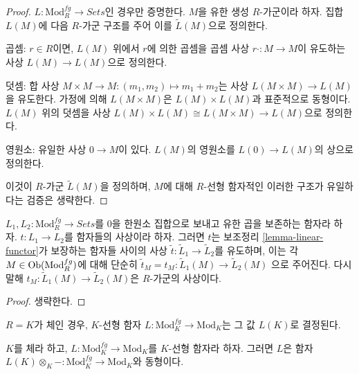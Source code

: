 \begin{proof}
$L: \text{Mod}^{fg}_R \to \textit{Sets}$인 경우만 증명한다.
$M$을 유한 생성 $R$-가군이라 하자. 집합 $L(M)$에 다음
$R$-가군 구조를 주어 이를 $\widetilde{L}(M)$으로 정의한다.

\medskip\noindent
곱셈: $r \in R$이면, $L(M)$ 위에서 $r$에 의한 곱셈을
곱셈 사상 $r \cdot : M \to M$이 유도하는 사상
$L(M) \to L(M)$으로 정의한다.

\medskip\noindent
덧셈: 합 사상 $M \times M \to M: (m_1, m_2) \mapsto m_1 + m_2$는
사상 $L(M \times M) \to L(M)$을 유도한다. 가정에 의해
$L(M \times M)$은 $L(M) \times L(M)$과 표준적으로 동형이다.
$L(M)$ 위의 덧셈을 사상
$L(M) \times L(M) \cong L(M \times M) \to L(M)$으로 정의한다.

\medskip\noindent
영원소: 유일한 사상 $0 \to M$이 있다. $L(M)$의 영원소를
$L(0) \to L(M)$의 상으로 정의한다.

\medskip\noindent
이것이 $R$-가군 $\widetilde{L}(M)$을 정의하며, $M$에 대해
$R$-선형 함자적인 이러한 구조가 유일하다는 검증은 생략한다.
\end{proof}

\begin{lemma}
\label{lemma-morphism-linear-functors}
$L_1, L_2: \text{Mod}^{fg}_R \to \textit{Sets}$를
$0$을 한원소 집합으로 보내고 유한 곱을 보존하는 함자라 하자.
$t : L_1 \to L_2$를 함자들의 사상이라 하자. 그러면 $t$는
보조정리 \ref{lemma-linear-functor}가 보장하는 함자들 사이의 사상
$\widetilde{t} : \widetilde{L}_1 \to \widetilde{L}_2$를 유도하며,
이는 각 $M \in \mathop{\mathrm{Ob}}\nolimits(\text{Mod}^{fg}_R)$에 대해 단순히
$\widetilde{t}_M = t_M: \widetilde{L}_1(M) \to \widetilde{L}_2(M)$
으로 주어진다. 다시 말해
$t_M: \widetilde{L}_1(M) \to \widetilde{L}_2(M)$은
$R$-가군의 사상이다.
\end{lemma}

\begin{proof}
생략한다.
\end{proof}

\noindent
$R = K$가 체인 경우, $K$-선형 함자
$L : \text{Mod}^{fg}_K \to \text{Mod}_K$는 그 값 $L(K)$로 결정된다.

\begin{lemma}
\label{lemma-linear-functor-over-field}
$K$를 체라 하고, $L: \text{Mod}^{fg}_K \to
\text{Mod}_K$를 $K$-선형 함자라 하자. 그러면 $L$은 함자
$L(K) \otimes_K - : \text{Mod}^{fg}_K \to
\text{Mod}_K$와 동형이다.
\end{lemma}

